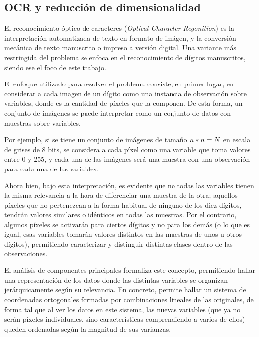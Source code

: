 \subsection{OCR y reducción de dimensionalidad}

El reconocimiento óptico de caracteres (\emph{Optical Character Regonition}) es la interpretación automatizada de texto en formato de imágen, y la conversión mecánica de texto manuscrito o impreso a versión digital. Una variante más restringida del problema se enfoca en el reconocimiento de dígitos manuscritos, siendo ese el foco de este trabajo.

El enfoque utilizado para resolver el problema consiste, en primer lugar, en considerar a cada imagen de un dígito como una instancia de observación sobre \N variables, donde \N es la cantidad de píxeles que la componen. De esta forma, un conjunto de \M imágenes se puede interpretar como un conjunto de datos con \M muestras sobre \N variables.

Por ejemplo, si se tiene un conjunto de imágenes de tamaño $n * n = N$ en escala de grises de 8 bits, se considera a cada píxel como una variable que toma valores entre 0 y 255, y cada una de las imágenes será una muestra con una observación para cada una de las \N variables.

Ahora bien, bajo esta interpretación, es evidente que no todas las variables tienen la misma relevancia a la hora de diferenciar una muestra de la otra; aquellos píxeles que no pertenezcan a la forma habitual de ninguno de los diez dígitos, tendrán valores similares o idénticos en todas las muestras. Por el contrario, algunos píxeles se activarán para ciertos dígitos y no para los demás (o lo que es igual, esas variables tomarán valores distintos en las muestras de unos u otros  dígitos), permitiendo caracterizar y distinguir distintas clases dentro de las observaciones.

El análisis de componentes principales formaliza este concepto, permitiendo hallar una representación de los datos donde las distintas variables se organizan jerárquicamente según su relevancia. En concreto, permite hallar un sistema de coordenadas ortogonales formadas por combinaciones lineales de las originales, de forma tal que al ver los datos en este sistema, las nuevas variables (que ya no serán píxeles individuales, sino características comprendiendo a varios de ellos) queden ordenadas según la magnitud de sus varianzas.



